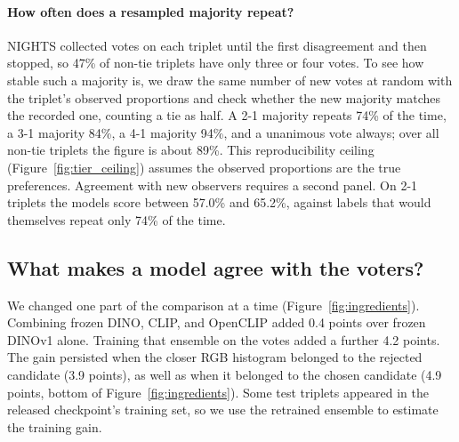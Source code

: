 \documentclass{article}
\begin{document}
\paragraph{How often does a resampled majority repeat?}\label{sec:ceiling} NIGHTS collected votes on each triplet until the first disagreement and then stopped, so 47\% of non-tie triplets have only three or four votes. To see how stable such a majority is, we draw the same number of new votes at random with the triplet's observed proportions and check whether the new majority matches the recorded one, counting a tie as half. A 2-1 majority repeats 74\% of the time, a 3-1 majority 84\%, a 4-1 majority 94\%, and a unanimous vote always; over all non-tie triplets the figure is about 89\%. This reproducibility ceiling (Figure~\ref{fig:tier_ceiling}) assumes the observed proportions are the true preferences. Agreement with new observers requires a second panel. On 2-1 triplets the models score between 57.0\% and 65.2\%, against labels that would themselves repeat only 74\% of the time.

\subsection{What makes a model agree with the voters?}\label{sec:backbone_head}

\label{sec:gain}We changed one part of the comparison at a time (Figure~\ref{fig:ingredients}). Combining frozen DINO, CLIP, and OpenCLIP added 0.4 points over frozen DINOv1 alone. Training that ensemble on the votes added a further 4.2 points. The gain persisted when the closer RGB histogram belonged to the rejected candidate (3.9 points), as well as when it belonged to the chosen candidate (4.9 points, bottom of Figure~\ref{fig:ingredients}). Some test triplets appeared in the released checkpoint's training set, so we use the retrained ensemble to estimate the training gain.
\end{document}
